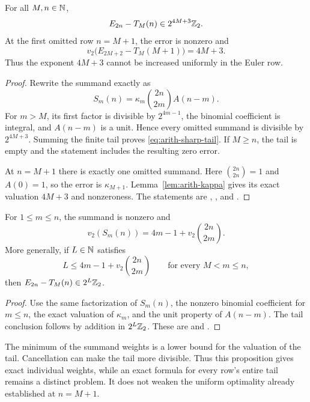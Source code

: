 \begin{theorem}\label{thm:arith-sharp-tower}
For all $M,n\in\mathbb N$,
\begin{equation}\label{eq:arith-sharp-tail}
 E_{2n}-T_M(n)\in2^{4M+3}\mathbb Z_2.
\end{equation}
At the first omitted row $n=M+1$, the error is nonzero and
\[
 v_2\bigl(E_{2M+2}-T_M(M+1)\bigr)=4M+3.
\]
Thus the exponent $4M+3$ cannot be increased uniformly in the Euler row.
\end{theorem}

\begin{proof}
Rewrite the summand exactly as
\[
 S_m(n)=\kappa_m\binom{2n}{2m}A(n-m).
\]
For $m>M$, its first factor is divisible by $2^{4m-1}$, the binomial
coefficient is integral, and $A(n-m)$ is a unit.  Hence every omitted
summand is divisible by $2^{4M+3}$.  Summing the finite tail proves
\eqref{eq:arith-sharp-tail}.  If $M\ge n$, the tail is empty and the
statement includes the resulting zero error.

At $n=M+1$ there is exactly one omitted summand.  Here
$\binom{2n}{2n}=1$ and $A(0)=1$, so the error is $\kappa_{M+1}$.
Lemma~\ref{lem:arith-kappa} gives its exact valuation $4M+3$ and
nonzeroness.  The statements are
,
, and
.
\end{proof}

\begin{proposition}\label{prop:arith-row-weight}
For $1\le m\le n$, the summand is nonzero and
\[
 v_2(S_m(n))=4m-1+v_2\binom{2n}{2m}.
\]
More generally, if $L\in\mathbb N$ satisfies
\[
 L\le4m-1+v_2\binom{2n}{2m}\qquad\text{for every }M<m\le n,
\]
then $E_{2n}-T_M(n)\in2^L\mathbb Z_2$.
\end{proposition}

\begin{proof}
Use the same factorization of $S_m(n)$, the nonzero binomial coefficient
for $m\le n$, the exact valuation of $\kappa_m$, and the unit property
of $A(n-m)$.  The tail conclusion follows by addition in $2^L\mathbb Z_2$.
These are  and
.
\end{proof}

The minimum of the summand weights is a lower bound for the valuation of
the tail.  Cancellation can make the tail more divisible.  Thus this
proposition gives exact individual weights, while an exact formula for
every row's entire tail remains a distinct problem.  It does not weaken
the uniform optimality already established at $n=M+1$.

